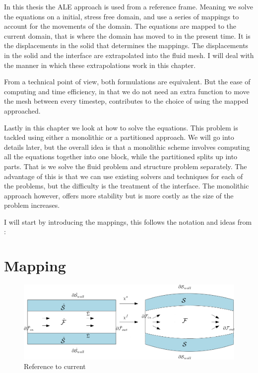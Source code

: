 In this thesis the ALE approach is used from a reference frame.
Meaning we solve the equations on a initial, stress free domain, and use a series of mappings to account for the movements of the domain. The equations are mapped to the current domain, that is where the domain has moved to in the present time. It is the displacements in the solid that determines the mappings. The displacements in the solid and the interface are extrapolated into the fluid mesh. I will deal with the manner in which these extrapolations work in this chapter. \newline

From a technical point of view, both formulations are equivalent.\cite{Richter2016} But the ease of computing and time efficiency, in that we do not need an extra function to move the mesh between every timestep, contributes to the choice of using the mapped approached. \newline

Lastly in this chapter we look at how to solve the equations. This problem is tackled using either a monolithic or a partitioned approach. We will go into details later, but the overall idea is that a monolithic scheme involves computing all the equations together into one block, while the partitioned splits up into parts. That is we solve the fluid problem and structure problem separately. The advantage of this is that we can use existing solvers and techniques for each of the problems, but the difficulty is the treatment of the interface. The monolithic approach however, offers more stability but is more costly as the size of the problem increases\cite{Liu2014}. \newline

I will start by introducing the mappings, this follows the notation and ideas from \cite{Richter2016}:

\section{Mapping}
\begin{figure}[H]
\caption{Reference to current}

\includegraphics[scale=0.45]{./FSI_ALE_formulation/FSI_mapping.png}
\end{figure}

